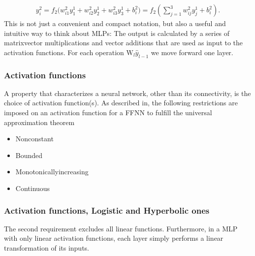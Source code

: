 \documentclass[letterpaper,10pt,english]{sphinxmanual}
\begin{document}
\begin{equation*}
\begin{split}
\begin{equation}
 y^2_i = f_2\Bigr(w^2_{i1}y^1_1 + w^2_{i2}y^1_2 + w^2_{i3}y^1_3 + b^2_i\Bigr) = 
 f_2\left(\sum_{j=1}^3 w^2_{ij} y_j^1 + b^2_i\right).
\label{_auto7} \tag{12}
\end{equation}
\end{split}
\end{equation*}
This is not just a convenient and compact notation, but also a useful
and intuitive way to think about MLPs: The output is calculated by a
series of matrix\sphinxhyphen{}vector multiplications and vector additions that are
used as input to the activation functions. For each operation
\(\mathrm{W}_l \hat{y}_{l-1}\) we move forward one layer.


\subsubsection{Activation functions}
\label{\detokenize{chapter6:activation-functions}}
A property that characterizes a neural network, other than its
connectivity, is the choice of activation function(s).  As described
in, the following restrictions are imposed on an activation function
for a FFNN to fulfill the universal approximation theorem
\begin{itemize}
\item {} 
Non\sphinxhyphen{}constant

\item {} 
Bounded

\item {} 
Monotonically\sphinxhyphen{}increasing

\item {} 
Continuous

\end{itemize}


\subsubsection{Activation functions, Logistic and Hyperbolic ones}
\label{\detokenize{chapter6:activation-functions-logistic-and-hyperbolic-ones}}
The second requirement excludes all linear functions. Furthermore, in
a MLP with only linear activation functions, each layer simply
performs a linear transformation of its inputs.
\end{document}
